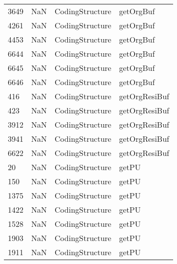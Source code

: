\begin{tabular}{llll}
3649 &                   NaN &            CodingStructure &                                 getOrgBuf \\
4261 &                   NaN &            CodingStructure &                                 getOrgBuf \\
4453 &                   NaN &            CodingStructure &                                 getOrgBuf \\
6644 &                   NaN &            CodingStructure &                                 getOrgBuf \\
6645 &                   NaN &            CodingStructure &                                 getOrgBuf \\
6646 &                   NaN &            CodingStructure &                                 getOrgBuf \\
416  &                   NaN &            CodingStructure &                             getOrgResiBuf \\
423  &                   NaN &            CodingStructure &                             getOrgResiBuf \\
3912 &                   NaN &            CodingStructure &                             getOrgResiBuf \\
3941 &                   NaN &            CodingStructure &                             getOrgResiBuf \\
6622 &                   NaN &            CodingStructure &                             getOrgResiBuf \\
20   &                   NaN &            CodingStructure &                                     getPU \\
150  &                   NaN &            CodingStructure &                                     getPU \\
1375 &                   NaN &            CodingStructure &                                     getPU \\
1422 &                   NaN &            CodingStructure &                                     getPU \\
1528 &                   NaN &            CodingStructure &                                     getPU \\
1903 &                   NaN &            CodingStructure &                                     getPU \\
1911 &                   NaN &            CodingStructure &                                     getPU \\

\end{tabular}
